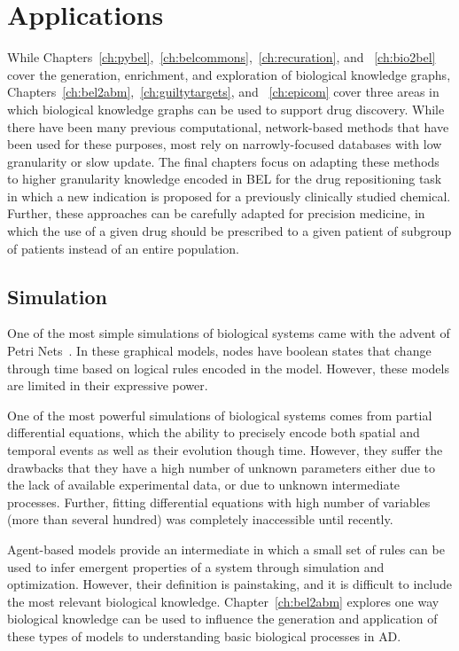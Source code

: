 \section{Applications}
\label{sec:introduction_applications}

While Chapters~\ref{ch:pybel},~\ref{ch:belcommons},~\ref{ch:recuration}, and ~\ref{ch:bio2bel} cover the generation, enrichment, and exploration of biological knowledge graphs, Chapters~\ref{ch:bel2abm},~\ref{ch:guiltytargets}, and ~\ref{ch:epicom} cover three areas in which biological knowledge graphs can be used to support drug discovery.
While there have been many previous computational, network-based methods that have been used for these purposes, most rely on narrowly-focused databases with low granularity or slow update.
The final chapters focus on adapting these methods to higher granularity knowledge encoded in BEL for the drug repositioning task in which a new indication is proposed for a previously clinically studied chemical.
Further, these approaches can be carefully adapted for precision medicine, in which the use of a given drug should be prescribed to a given patient of subgroup of patients instead of an entire population.

\subsection{Simulation}

One of the most simple simulations of biological systems came with the advent of Petri Nets~\cite{Peterson1977}.
In these graphical models, nodes have boolean states that change through time based on logical rules encoded in the model.
However, these models are limited in their expressive power.

One of the most powerful simulations of biological systems comes from partial differential equations, which the ability to precisely encode both spatial and temporal events as well as their evolution though time.
However, they suffer the drawbacks that they have a high number of unknown parameters either due to the lack of available experimental data, or due to unknown intermediate processes.
Further, fitting differential equations with high number of variables (more than several hundred) was completely inaccessible until recently.

Agent-based models provide an intermediate in which a small set of rules can be used to infer emergent properties of a system through simulation and optimization.
However, their definition is painstaking, and it is difficult to include the most relevant biological knowledge.
Chapter~\ref{ch:bel2abm} explores one way biological knowledge can be used to influence the generation and application of these types of models to understanding basic biological processes in \ac{AD}.

